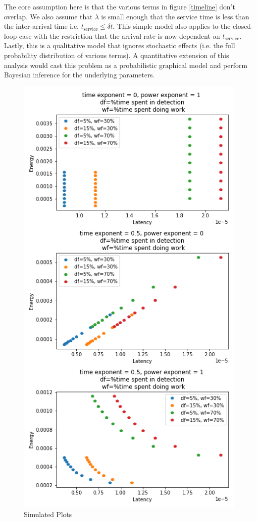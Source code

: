 The core assumption here is that the various terms in figure \ref{timeline} don't overlap. We also assume that $\lambda$ is small enough that the service time is less than the inter-arrival time i.e. $t_{\text{service}} \leq \delta t$. This simple model also applies to the closed-loop case with the restriction that the arrival rate is now dependent on $t_{\text{service}}$. Lastly, this is a qualitative model that ignores stochastic effects (i.e. the full probability distribution of various terms). A quantitative extension of this analysis would cast this problem as a probabilistic graphical model and perform Bayesian inference for the underlying parameters.

\begin{figure}
\centering
\includegraphics[width=1.1\columnwidth]{figures/model_plots}
\caption[]{Simulated Plots}
\label{fig:simplots}
\vspace{-0.28in}
\end{figure}

